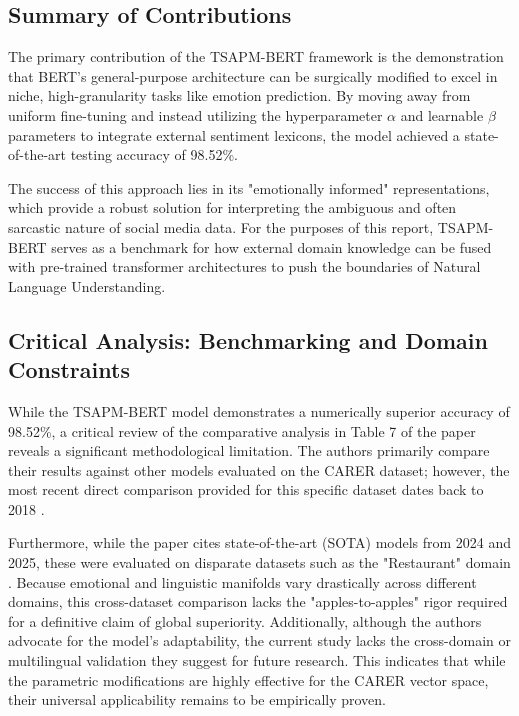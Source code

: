 \documentclass[a4paper,12pt]{article}
\begin{document}
\subsection{Summary of Contributions}

The primary contribution of the TSAPM-BERT framework is the demonstration that BERT's general-purpose architecture can be surgically modified to excel in niche, high-granularity tasks like emotion prediction. By moving away from uniform fine-tuning and instead utilizing the hyperparameter $\alpha$ and learnable $\beta$ parameters to integrate external sentiment lexicons, the model achieved a state-of-the-art testing accuracy of 98.52\%. 

The success of this approach lies in its "emotionally informed" representations, which provide a robust solution for interpreting the ambiguous and often sarcastic nature of social media data. For the purposes of this report, TSAPM-BERT serves as a benchmark for how external domain knowledge can be fused with pre-trained transformer architectures to push the boundaries of Natural Language Understanding.

\subsection{Critical Analysis: Benchmarking and Domain Constraints}

While the TSAPM-BERT model demonstrates a numerically superior accuracy of 98.52\%, a critical review of the comparative analysis in Table 7 of the paper reveals a significant methodological limitation. The authors primarily compare their results against other models evaluated on the CARER dataset; however, the most recent direct comparison provided for this specific dataset dates back to 2018 \citep{saravia2018carer}. 

Furthermore, while the paper cites state-of-the-art (SOTA) models from 2024 and 2025, these were evaluated on disparate datasets such as the "Restaurant" domain \citep{zhao2025aspect}. Because emotional and linguistic manifolds vary drastically across different domains, this cross-dataset comparison lacks the "apples-to-apples" rigor required for a definitive claim of global superiority. Additionally, although the authors advocate for the model's adaptability, the current study lacks the cross-domain or multilingual validation they suggest for future research. This indicates that while the parametric modifications are highly effective for the CARER vector space, their universal applicability remains to be empirically proven.
\end{document}
